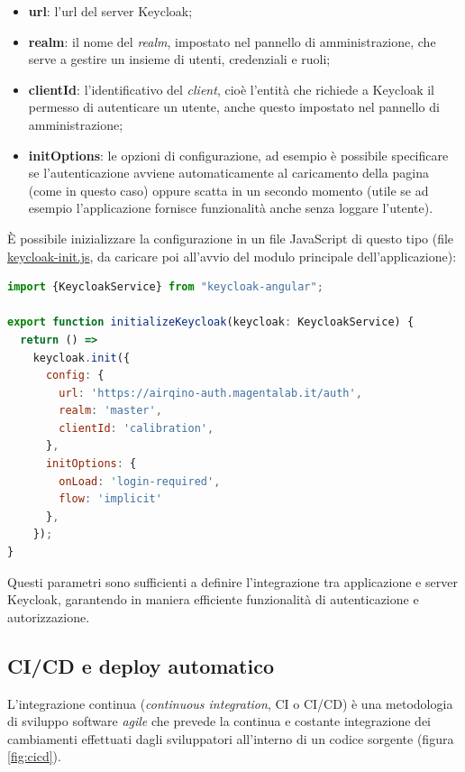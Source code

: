 \begin{itemize}
  \item \textbf{url}: l'url del server Keycloak;
  \item \textbf{realm}: il nome del \textit{realm}, impostato nel pannello di amministrazione, che serve a gestire un insieme di utenti, credenziali e ruoli;
  \item \textbf{clientId}: l'identificativo del \textit{client}, cioè l'entità che richiede a Keycloak il permesso di autenticare un utente, anche questo impostato nel pannello di amministrazione;
  \item \textbf{initOptions}: le opzioni di configurazione, ad esempio è possibile specificare se l'autenticazione avviene automaticamente al caricamento della pagina (come in questo caso) oppure scatta in un secondo momento (utile se ad esempio l'applicazione fornisce funzionalità anche senza loggare l'utente).
\end{itemize}

È possibile inizializzare la configurazione in un file JavaScript di questo tipo (file \url{keycloak-init.js}, da caricare poi all'avvio del modulo principale dell'applicazione):

\vspace{1mm}
\begin{lstlisting}[language=js]
import {KeycloakService} from "keycloak-angular";

export function initializeKeycloak(keycloak: KeycloakService) {
  return () =>
    keycloak.init({
      config: {
        url: 'https://airqino-auth.magentalab.it/auth',
        realm: 'master',
        clientId: 'calibration',
      },
      initOptions: {
        onLoad: 'login-required',
        flow: 'implicit'
      },
    });
}
\end{lstlisting}

Questi parametri sono sufficienti a definire l'integrazione tra applicazione e server Keycloak, garantendo in maniera efficiente funzionalità di autenticazione e autorizzazione.

\subsection{CI/CD e deploy automatico}\label{sec:ci}
L'integrazione continua (\textit{continuous integration}, CI o CI/CD) è una metodologia di sviluppo software \textit{agile} che prevede la continua e costante integrazione dei cambiamenti effettuati dagli sviluppatori all'interno di un codice sorgente (figura \ref{fig:cicd}).

